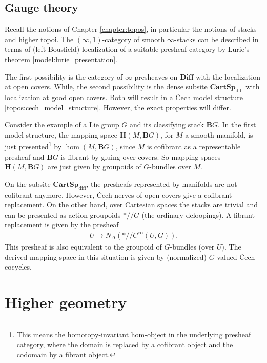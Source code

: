 \subsection{Gauge theory}

    Recall the notions of Chapter \ref{chapter:topos}, in particular the notions of stacks and higher topoi. The $(\infty,1)$-category of smooth $\infty$-stacks can be described in terms of (left Bousfield) localization of a suitable presheaf category by Lurie's theorem \ref{model:lurie_presentation}.

    The first possibility is the category of $\infty$-presheaves on $\mathbf{Diff}$ with the localization at open covers. While, the second possibility is the dense subsite $\mathbf{CartSp}_\mathrm{diff}$ with localization at good open covers. Both will result in a \v{C}ech model structure \ref{topos:cech_model_structure}. However, the exact properties will differ.

    \begin{example}
        Consider the example of a Lie group $G$ and its classifying stack $\mathbf{B}G$. In the first model structure, the mapping space $\mathbf{H}(M,\mathbf{B}G)$, for $M$ a smooth manifold, is just presented\footnote{This means the homotopy-invariant hom-object in the underlying presheaf category, where the domain is replaced by a cofibrant object and the codomain by a fibrant object.} by $\hom(M,\mathbf{B}G)$, since $M$ is cofibrant as a representable presheaf and $\mathbf{B}G$ is fibrant by gluing over covers. So mapping spaces $\mathbf{H}(M,\mathbf{B}G)$ are just given by groupoids of $G$-bundles over $M$.

        On the subsite $\mathbf{CartSp}_\mathrm{diff}$, the presheafs represented by manifolds are not cofibrant anymore. However, \v{C}ech nerves of open covers give a cofibrant replacement. On the other hand, over Cartesian spaces the stacks are trivial and can be presented as action groupoids $\ast/\!\!/G$ (the ordinary deloopings). A fibrant replacement is given by the presheaf
        \begin{gather}
            U\mapsto N_\Delta(\ast/\!\!/C^\infty(U,G)).
        \end{gather}
        This presheaf is also equivalent to the groupoid of $G$-bundles (over $U$). The derived mapping space in this situation is given by (normalized) $G$-valued \v{C}ech cocycles.
    \end{example}

\section{Higher geometry}

